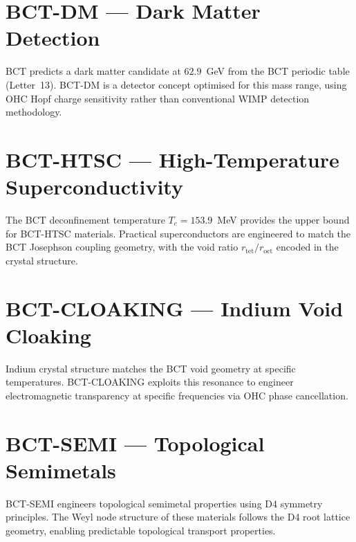 \documentclass[aps,prl,twocolumn,showpacs,preprintnumbers]{revtex4-2}
\newcommand{\roct}{r_{\mathrm{oct}}}
\newcommand{\rtet}{r_{\mathrm{tet}}}
\begin{document}
\section{BCT-DM --- Dark Matter Detection}

BCT predicts a dark matter candidate at $62.9$~GeV from the BCT
periodic table (Letter~13). BCT-DM is a detector concept optimised
for this mass range, using OHC Hopf charge sensitivity rather than
conventional WIMP detection methodology.

\section{BCT-HTSC --- High-Temperature Superconductivity}

The BCT deconfinement temperature $T_c = 153.9$~MeV provides the
upper bound for BCT-HTSC materials. Practical superconductors are
engineered to match the BCT Josephson coupling geometry, with the
void ratio $\rtet/\roct$ encoded in the crystal structure.

\section{BCT-CLOAKING --- Indium Void Cloaking}

Indium crystal structure matches the BCT void geometry at specific
temperatures. BCT-CLOAKING exploits this resonance to engineer
electromagnetic transparency at specific frequencies via OHC phase
cancellation.

\section{BCT-SEMI --- Topological Semimetals}

BCT-SEMI engineers topological semimetal properties using D4 symmetry
principles. The Weyl node structure of these materials follows the
D4 root lattice geometry, enabling predictable topological transport
properties.
\end{document}
